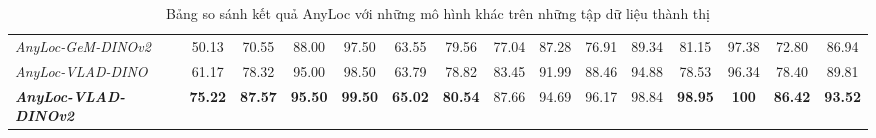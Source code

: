 \begin{table}[H]
{\begin{tabular}{lcccccccccccccc}
      \rowcolor[HTML]{FFCE93}
      \textit{AnyLoc-GeM-DINOv2}             & 50.13                                                           & 70.55                                                              & 88.00                                                          & 97.50                                                          & 63.55                                                         & 79.56                                                       & 77.04                                 & 87.28                    & 76.91                    & 89.34                    & 81.15                    & 97.38                    & 72.80                    & 86.94                    \\
      \rowcolor[HTML]{FFCE93}
      \textit{AnyLoc-VLAD-DINO}              & 61.17                                                           & 78.32                                                              & 95.00                                                          & 98.50                                                          & 63.79                                                         & 78.82                                                       & 83.45                                 & 91.99                    & 88.46                    & 94.88                    & 78.53                    & 96.34                    & 78.40                    & 89.81                    \\
      \rowcolor[HTML]{FFCE93}
      \textit{\textbf{AnyLoc-VLAD-DINOv2}}   & \textbf{75.22}                                                  & \textbf{87.57}                                                     & \textbf{95.50}                                                 & \textbf{99.50}                                                 & \textbf{65.02}                                                & \textbf{80.54}                                              & 87.66                                 & 94.69                    & 96.17                    & 98.84                    & \textbf{98.95}           & \textbf{100}             & \textbf{86.42}           & \textbf{93.52}
    \end{tabular}}
  \caption{Bảng so sánh kết quả AnyLoc với những mô hình khác trên những tập dữ liệu thành thị}
\end{table}

